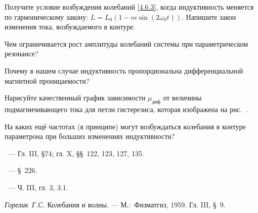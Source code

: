 \begin{lab:questions}
\item
Получите условие возбуждения колебаний \eqref{4.6.3}, когда индуктивность
меняется по гармоническому закону: $L = L_0(1-m\sin(2\omega_0t))$. Напишите закон
изменения тока, возбуждаемого в контуре.

\item Чем ограничивается рост амплитуды колебаний системы при параметрическом резонансе?

\item
Почему в нашем случае индуктивность пропорциональна дифференциальной магнитной
проницаемости?

\item
Нарисуйте качественный график зависимости $\mu_\text{диф}$ от величины
подмагничивающего тока для петли гистерезиса, которая изображена на
рис.~.

\item
На каких ещё частотах (в принципе) могут возбуждаться колебания в контуре
параметрона при больших изменениях индуктивности?


\end{lab:questions}


\begin{lab:literature}
\item
\SivuhinIII~--- Гл. III, \S 74; гл. X, \S\S~122, 123, 127, 135.

\item
\Kalashnikov~--- \S~226.

\item
\KingLokOlh~--- Ч. III, гл. 3, 3.1.

\item
\textit{Горелик~Г.С.} Колебания и волны. --- М.:~Физматгиз, 1959. Гл. III, \S~9.

\end{lab:literature}
